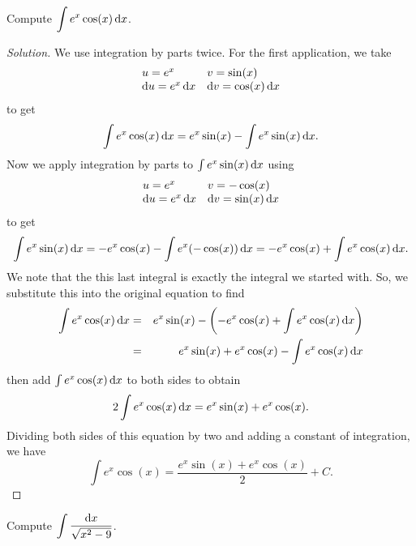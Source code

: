 \documentclass[12pt]{amsart}
\begin{document}
\begin{thm}
  Compute
  \(\displaystyle{\int e^x\cos(x)\dif x}\).
\end{thm}
\begin{proof}[Solution]
      We use integration by parts twice.
      For the first application, we take
      \[\begin{array}{ll}
      u = e^x & v = \sin(x)\\
      \dif u = e^x \dif x & \dif v = \cos(x)\dif x
      \end{array}\]
      to get
      \[\int e^x \cos(x)\dif x = e^x\sin(x) - \int e^x\sin(x)\dif x.\]
      Now we apply integration by parts to \(\int e^x\sin(x)\dif x\) using
      \[\begin{array}{ll}
      u = e^x & v = -\cos(x)\\
      \dif u = e^x \dif x & \dif v = \sin(x)\dif x
      \end{array}\]
      to get
      \[\int e^x\sin(x)\dif x = -e^x\cos(x) - \int e^x(-\cos(x))\dif x = -e^x\cos(x) + \int e^x\cos(x)\dif x.\]
      We note that the this last integral is exactly the integral we started with.
      So, we substitute this into the original equation to find
      \begin{eqnarray*}
        \int e^x\cos(x)\dif x &=& e^x\sin(x) - \left(-e^x \cos(x) + \int e^x\cos(x)\dif x\right)\\
        &=& e^x\sin(x) + e^x\cos(x) - \int e^x\cos(x)\dif x
      \end{eqnarray*}
      then add \(\int e^x \cos(x)\dif x\) to both sides to obtain
      \[2 \int e^x\cos(x)\dif x = e^x \sin(x) + e^x \cos(x).\]
      Dividing both sides of this equation by two and adding a constant of integration, we have
      \[\int e^x\cos(x) = \frac{e^x\sin(x) + e^x\cos(x)}{2} + C.\]
\end{proof}


\begin{thm}[20 Points]
  Compute \(\displaystyle{\int\frac{\dif x}{\sqrt{x^2 - 9}}}\).
\end{thm}
\end{document}
